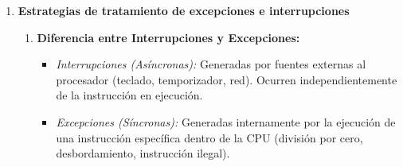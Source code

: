 \documentclass[12pt,letterpaper]{article}
\begin{document}
\begin{enumerate}
    \vspace{0.2cm}
    \begin{enumerate}[label=\alph*)]
        \item \textbf{Situaciones comunes de excepción:}
        \begin{itemize}
            \item \textit{Desbordamiento Aritmético (Arithmetic Overflow):} Ocurre con instrucciones de suma/resta con signo (\texttt{add}, \texttt{sub}).
            \item \textit{Fallo de Dirección (Address Error):} Lectura o escritura de palabra no alineada a múltiplo de 4 bytes (\texttt{lw}/\texttt{sw}).
            \item \textit{Instrucción Reservada (Reserved Instruction):} Intento de ejecutar un código de operación no válido o no soportado.
            \item \textit{Llamada al Sistema / Trap (\texttt{syscall}):} Excepción provocada voluntariamente por software para solicitar servicios del SO.
        \end{itemize}
        
        \item \textbf{Excepciones en las etapas del pipeline:}
        \begin{itemize}
            \item \textbf{IF (Fetch):} Error de alineación en la búsqueda de instrucciones o fallo en el caché de instrucciones.
            \item \textbf{ID (Decode):} Detección de instrucción no válida o violación de privilegios.
            \item \textbf{EX (Execute):} Excepciones aritméticas (desbordamiento) o trampas condicionales.
            \item \textbf{MEM (Memory):} Fallos de alineación de direcciones de datos o violaciones de protección de memoria RAM.
        \end{itemize}
    \end{enumerate}

    \item \textbf{\large\color{UCBlue}Estrategias de tratamiento de excepciones e interrupciones}
    
    \vspace{0.2cm}
    \begin{enumerate}[label=\alph*)]
        \item \textbf{Diferencia entre Interrupciones y Excepciones:}
        \begin{itemize}
            \item \textit{Interrupciones (Asíncronas):} Generadas por fuentes externas al procesador (teclado, temporizador, red). Ocurren independientemente de la instrucción en ejecución.
            \item \textit{Excepciones (Síncronas):} Generadas internamente por la ejecución de una instrucción específica dentro de la CPU (división por cero, desbordamiento, instrucción ilegal).
        \end{itemize}
        

\end{enumerate}
\end{enumerate}
\end{document}
